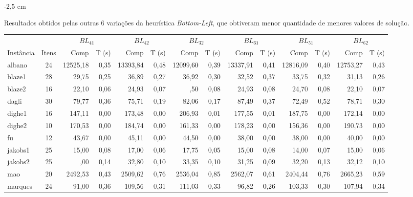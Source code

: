 \begin{adjustwidth}{-2 cm}{-2,5 cm}\centering\begin{threeparttable}
\renewcommand{\arraystretch}{1.2}%
    \caption{Resultados obtidos pelas outras 6 variações da heurística \textit{Bottom-Left}, que obtiveram menor quantidade de menores valores de solução.}
    \scriptsize{
        \begin{tabular}{|l|c|rr|rr|rr|rr|rr|rr|}\hline
        \multicolumn{1}{|c|}{} & \multicolumn{1}{c|}{} &  \multicolumn{2}{c|}{$BL_{41}$} & \multicolumn{2}{c|}{$BL_{42}$} & \multicolumn{2}{c|}{$BL_{32}$} &
        \multicolumn{2}{c|}{$BL_{61}$} &
        \multicolumn{2}{c|}{$BL_{51}$} &
        \multicolumn{2}{c|}{$BL_{62}$}\\
            Instância &Itens &Comp &T (s) &Comp &T (s) &Comp &T (s) &Comp &T (s) &Comp &T (s) &Comp &T (s) \\\hline
            albano &24  &12525,18 &0,35  &13393,84 &0,48  &12099,60 &0,39  &13337,91 &0,41  &12816,09 &0,40  &12753,27 &0,43 \\
            blaze1 &28  &29,75 &0,25  &36,89 &0,27  &36,92 &0,30  &32,52 &0,37  &33,75 &0,32  &31,13 &0,26 \\
            blaze2 &16  &22,10 &0,06  &24,93 &0,07  &\lgray21,50 &0,08  &24,93 &0,08  &24,70 &0,08  &22,10 &0,07 \\
            dagli &30  &79,77 &0,36  &75,71 &0,19  &82,06 &0,17  &87,49 &0,37  &72,49 &0,52  &78,71 &0,30 \\
            dighe1 &16  &147,11 &0,00  &173,48 &0,00  &206,93 &0,01  &177,55 &0,01  &187,75 &0,00  &172,14 &0,00 \\
            dighe2 &10  &170,53 &0,00  &184,74 &0,00  &161,33 &0,00  &178,23 &0,00  &156,36 &0,00  &190,73 &0,00 \\
            fu &12  &43,67 &0,00  &45,11 &0,00  &44,50 &0,00  &38,00 &0,00  &38,00 &0,00  &40,00 &0,00 \\
            jakobs1 &25  &15,00 &0,08  &17,00 &0,06  &17,75 &0,05  &15,00 &0,08  &14,00 &0,07  &15,00 &0,06 \\
            jakobs2 &25  &\lgray29,00 &0,14  &32,80 &0,10  &33,35 &0,10  &31,25 &0,09  &32,20 &0,13  &32,12 &0,10 \\
            mao &20  &2492,53 &0,43  &2509,62 &0,76  &2536,04 &0,85  &2562,07 &0,61  &2404,44 &0,76  &2665,23 &0,59 \\
            marques &24  &91,00 &0,36  &109,56 &0,31  &111,03 &0,33  &96,82 &0,26  &103,33 &0,30  &107,94 &0,34 \\

\end{tabular}}
\end{threeparttable}
\end{adjustwidth}
